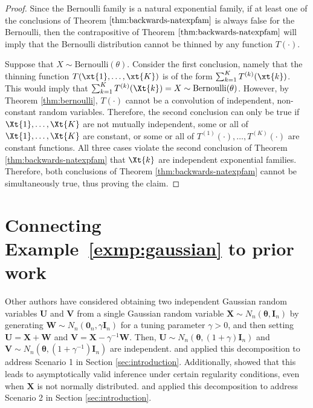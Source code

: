\documentclass[12pt]{article}
\begin{document}
\begin{proof}
Since the Bernoulli family is a natural exponential family, if at least one of the conclusions of Theorem $\ref{thm:backwards-natexpfam}$ is always false for the Bernoulli, then the contrapositive of Theorem $\ref{thm:backwards-natexpfam}$ will imply that the Bernoulli distribution cannot be thinned by any function $T(\cdot)$. 

Suppose that $X\sim\text{Bernoulli}(\theta)$. Consider the first conclusion, namely that the thinning function $T(\xt{1},\dots,\xt{K})$ is of the form $\sum_{k=1}^KT^{(k)}(\xt{k})$. This would imply that $\sum_{k=1}^KT^{(k)}(\Xt{k})=X\sim\text{Bernoulli}(\theta)$.  However, by Theorem \ref{thm:bernoulli}, $T(\cdot)$ cannot be a convolution of independent, non-constant random variables. Therefore, the second conclusion can only be true if $\Xt{1},\dots,\Xt{K}$ are not mutually independent, some or all of $\Xt{1},\dots,\Xt{K}$ are constant, or some or all of $T^{(1)}(\cdot),\dots,T^{(K)}(\cdot)$ are constant functions. All three cases violate the second conclusion of Theorem \ref{thm:backwards-natexpfam} that $\Xt{k}$ are independent exponential families. Therefore, both conclusions of Theorem \ref{thm:backwards-natexpfam} cannot be simultaneously true, thus proving the claim. 
\end{proof}





\section{Connecting Example~\ref{exmp:gaussian} to prior work} \label{app:UV}
 
Other authors have considered obtaining two independent Gaussian random variables $\mathbf{U}$ and $\mathbf{V}$ from a single Gaussian random variable $\mathbf{X} \sim N_n(\boldsymbol\theta, \mathbf{I}_n)$ by generating $\mathbf{W} \sim N_n(\mathbf{0}_n, \gamma \mathbf{I}_n)$ for a tuning parameter $\gamma > 0$, and then setting $\mathbf{U} = \mathbf{X} + \mathbf{W}$ and  $\mathbf{V} = \mathbf{X} - \gamma^{-1}\mathbf{W}$. Then, $\mathbf{U} \sim N_n(\boldsymbol\theta, (1 + \gamma) \mathbf{I}_n)$ and $\mathbf{V} \sim N_n(\boldsymbol\theta, (1 + \gamma^{-1}) \mathbf{I}_n)$ are independent.
\citet{rasines2021splitting} and \citet{leiner2022data} applied this decomposition to address Scenario 1 in Section \ref{sec:introduction}. Additionally, \citet{rasines2021splitting} showed that this leads to asymptotically valid inference under certain regularity conditions, even when $\mathbf{X}$ is not normally distributed.  \citet{tian2020prediction} and \citet{oliveira2021unbiased} applied this decomposition to address Scenario 2 in Section \ref{sec:introduction}. 
\end{document}

